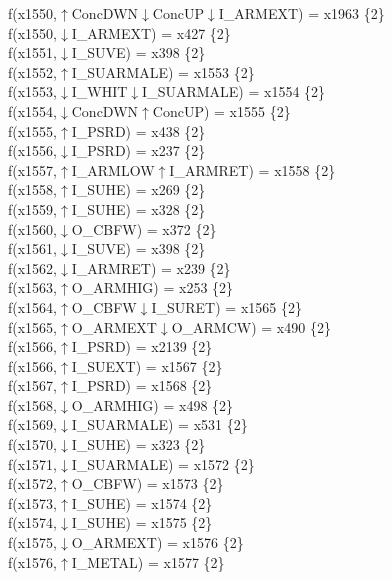 f(x1550,$\uparrow$ConcDWN$\downarrow$ConcUP$\downarrow$I\_ARMEXT) = x1963 \{2\} \\  
f(x1550,$\downarrow$I\_ARMEXT) = x427 \{2\} \\  
f(x1551,$\downarrow$I\_SUVE) = x398 \{2\} \\  
f(x1552,$\uparrow$I\_SUARMALE) = x1553 \{2\} \\  
f(x1553,$\downarrow$I\_WHIT$\downarrow$I\_SUARMALE) = x1554 \{2\} \\  
f(x1554,$\downarrow$ConcDWN$\uparrow$ConcUP) = x1555 \{2\} \\  
f(x1555,$\uparrow$I\_PSRD) = x438 \{2\} \\  
f(x1556,$\downarrow$I\_PSRD) = x237 \{2\} \\  
f(x1557,$\uparrow$I\_ARMLOW$\uparrow$I\_ARMRET) = x1558 \{2\} \\  
f(x1558,$\uparrow$I\_SUHE) = x269 \{2\} \\  
f(x1559,$\uparrow$I\_SUHE) = x328 \{2\} \\  
f(x1560,$\downarrow$O\_CBFW) = x372 \{2\} \\  
f(x1561,$\downarrow$I\_SUVE) = x398 \{2\} \\  
f(x1562,$\downarrow$I\_ARMRET) = x239 \{2\} \\  
f(x1563,$\uparrow$O\_ARMHIG) = x253 \{2\} \\  
f(x1564,$\uparrow$O\_CBFW$\downarrow$I\_SURET) = x1565 \{2\} \\  
f(x1565,$\uparrow$O\_ARMEXT$\downarrow$O\_ARMCW) = x490 \{2\} \\  
f(x1566,$\uparrow$I\_PSRD) = x2139 \{2\} \\  
f(x1566,$\uparrow$I\_SUEXT) = x1567 \{2\} \\  
f(x1567,$\uparrow$I\_PSRD) = x1568 \{2\} \\  
f(x1568,$\downarrow$O\_ARMHIG) = x498 \{2\} \\  
f(x1569,$\downarrow$I\_SUARMALE) = x531 \{2\} \\  
f(x1570,$\downarrow$I\_SUHE) = x323 \{2\} \\  
f(x1571,$\downarrow$I\_SUARMALE) = x1572 \{2\} \\  
f(x1572,$\uparrow$O\_CBFW) = x1573 \{2\} \\  
f(x1573,$\uparrow$I\_SUHE) = x1574 \{2\} \\  
f(x1574,$\downarrow$I\_SUHE) = x1575 \{2\} \\  
f(x1575,$\downarrow$O\_ARMEXT) = x1576 \{2\} \\  
f(x1576,$\uparrow$I\_METAL) = x1577 \{2\} \\  
